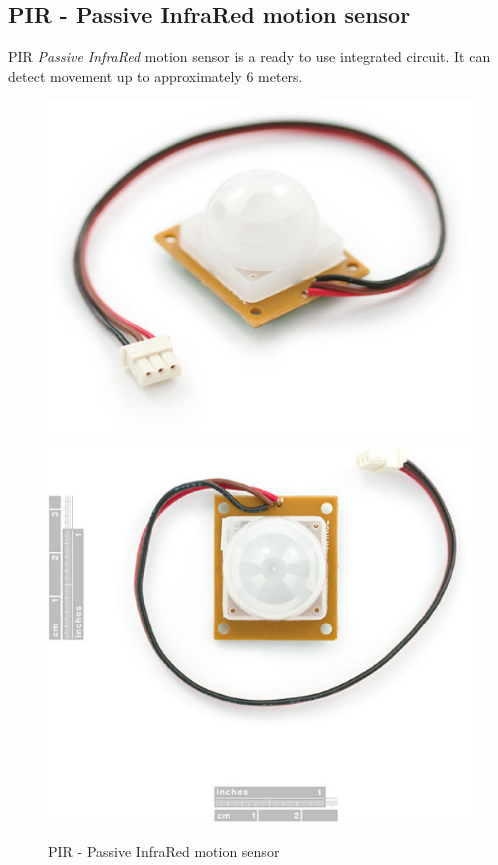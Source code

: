 \documentclass[12pt,a4paper]{report}
\begin{document}
\subsection{PIR - Passive InfraRed motion sensor}
PIR \textit{Passive InfraRed} motion sensor is a ready to use integrated circuit. It can detect movement up to approximately 6 meters.
\ \\
\begin{figure}[H]
\centering
\includegraphics*[scale=0.2]{pir}
\includegraphics*[scale=0.2]{pir_2}
\caption{PIR - Passive InfraRed motion sensor}
\end{figure}
\end{document}
